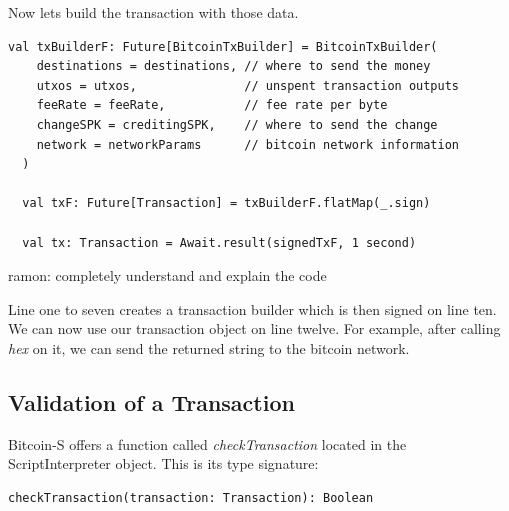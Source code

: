 \documentclass[runningheads]{llncs}
\newcommand{\todo}[1]{{\par \color{red}#1}}
\begin{document}
Now lets build the transaction with those data.
\begin{lstlisting}[style=scala]
  val txBuilderF: Future[BitcoinTxBuilder] = BitcoinTxBuilder(
    destinations = destinations, // where to send the money
    utxos = utxos,               // unspent transaction outputs
    feeRate = feeRate,           // fee rate per byte
    changeSPK = creditingSPK,    // where to send the change
    network = networkParams      // bitcoin network information
  )

  val txF: Future[Transaction] = txBuilderF.flatMap(_.sign)

  val tx: Transaction = Await.result(signedTxF, 1 second)
\end{lstlisting}

\todo{ramon: completely understand and explain the code}

Line one to seven creates a transaction builder which is then signed
on line ten.  We can now use our transaction object on line twelve.
For example, after calling \emph{hex} on it, we can send the returned
string to the bitcoin network.


\subsection{Validation of a Transaction}

Bitcoin-S offers a function called \emph{checkTransaction} located in the ScriptInterpreter object.
This is its type signature:
\begin{lstlisting}[style=scala]
  checkTransaction(transaction: Transaction): Boolean
\end{lstlisting}
\end{document}

